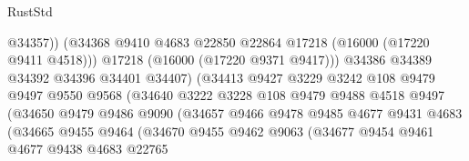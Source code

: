 \begin{lexlean}{RustStd}
\begin{coremodule}
                                        @34357))
                                    (@34368
                                      @9410
                                      @4683
                                      @22850
                                      @22864
                                      @17218
                                      (@16000 (@17220 @9411 @4518)))
                                    @17218
                                    (@16000 (@17220 @9371 @9417)))
                                  @34386
                                  @34389
                                  @34392
                                  @34396
                                  @34401
                                  @34407)
                                (@34413
                                  @9427
                                  @3229
                                  @3242
                                  @108
                                  @9479
                                  @9497
                                  @9550
                                  @9568
                                  (@34640
                                    @3222
                                    @3228
                                    @108
                                    @9479
                                    @9488
                                    @4518
                                    @9497
                                    (@34650
                                      @9479
                                      @9486
                                      @9090
                                      (@34657
                                        @9466
                                        @9478
                                        @9485
                                        @4677
                                        @9431
                                        @4683
                                        (@34665
                                          @9455
                                          @9464
                                          (@34670
                                            @9455
                                            @9462
                                            @9063
                                            (@34677
                                              @9454
                                              @9461
                                              @4677
                                              @9438
                                              @4683
                                              @22765

\end{coremodule}
\end{lexlean}
